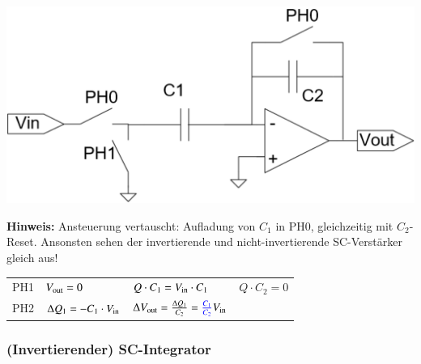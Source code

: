 \begin{minipage}[c]{0.4\columnwidth}
    \includegraphics[width=\columnwidth]{images/nicht-invertierender_sc_verstaerker.png}
\end{minipage}
\hfill
\begin{minipage}[c]{0.58\columnwidth}
    \textbf{Hinweis:} Ansteuerung vertauscht: Aufladung von $C_1$ in PH0, gleichzeitig mit $C_2$-Reset. Ansonsten sehen der 
    invertierende und nicht-invertierende SC-Verstärker gleich aus!
\end{minipage}

\begin{tabular}{@{}l l l l@{}} 
    PH1   & $V_{\rm out} = 0$                    & $Q \cdot C_1 = V_{\rm in} \cdot C_1$  & $ Q \cdot C_2 = 0$ \\
    PH2   & $\Delta Q_1 = -C_1 \cdot V_{\rm in}$ & $\Delta V_{\rm out} = \frac{\Delta Q_1}{C_2} = {\color{blue} \frac{C_1}{C_2} } V_{\rm in}$ \\
\end{tabular}


\subsubsection{(Invertierender) SC-Integrator}

